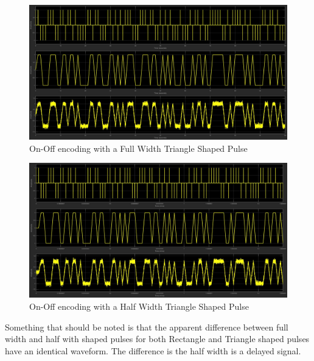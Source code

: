 \documentclass{article}
\begin{document}
\begin{figure}[H]
  \includegraphics[width = \linewidth]{Polar_Tri_F.jpg}
  \caption{On-Off encoding with a Full Width Triangle Shaped Pulse}
  \label{fig:Polar-Tri-F}
\end{figure}
\begin{figure}[H]
  \includegraphics[width = \linewidth]{Polar_Tri_H.jpg}
  \caption{On-Off encoding with a Half Width Triangle Shaped Pulse}
  \label{fig:Polar-Tri-H}
\end{figure}
Something that should be noted is that the apparent difference between full width and half with shaped pulses for both Rectangle and Triangle shaped pulses have an identical waveform. The difference is the half width is a delayed signal.
\end{document}
